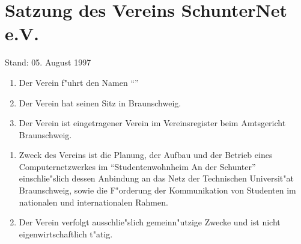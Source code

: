 
\section{Satzung des Vereins SchunterNet e.V.}
\label{satzung}

{\small Stand: 05. August 1997}

\begin{enumerate}
\item Der Verein f"uhrt den Namen "`\snev"'
\item Der Verein hat seinen Sitz in Braunschweig.
\item Der Verein ist eingetragener Verein im Vereinsregister beim Amtsgericht 
Braunschweig.
\end{enumerate}

\begin{enumerate}
\item Zweck des Vereins \snev ist die Planung, der Aufbau
    und der Betrieb eines Computernetzwerkes im "`Studentenwohnheim An der
    Schunter"' einschlie"slich dessen Anbindung an das Netz der Technischen
    Universit"at Braunschweig, sowie die F"orderung der Kommunikation von
    Studenten im nationalen und internationalen Rahmen.
\item Der Verein verfolgt ausschlie"slich gemeinn"utzige Zwecke und ist nicht
    eigenwirtschaftlich t"atig.
\end{enumerate}

